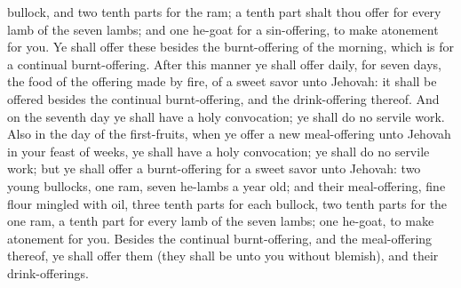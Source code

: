 bullock, and two tenth parts for the ram; a tenth part shalt thou offer for every lamb of the seven lambs; and one he-goat for a sin-offering, to make atonement for you. Ye shall offer these besides the burnt-offering of the morning, which is for a continual burnt-offering. After this manner ye shall offer daily, for seven days, the food of the offering made by fire, of a sweet savor unto Jehovah: it shall be offered besides the continual burnt-offering, and the drink-offering thereof. And on the seventh day ye shall have a holy convocation; ye shall do no servile work.  Also in the day of the first-fruits, when ye offer a new meal-offering unto Jehovah in your feast of weeks, ye shall have a holy convocation; ye shall do no servile work; but ye shall offer a burnt-offering for a sweet savor unto Jehovah: two young bullocks, one ram, seven he-lambs a year old; and their meal-offering, fine flour mingled with oil, three tenth parts for each bullock, two tenth parts for the one ram, a tenth part for every lamb of the seven lambs; one he-goat, to make atonement for you. Besides the continual burnt-offering, and the meal-offering thereof, ye shall offer them (they shall be unto you without blemish), and their drink-offerings. 

